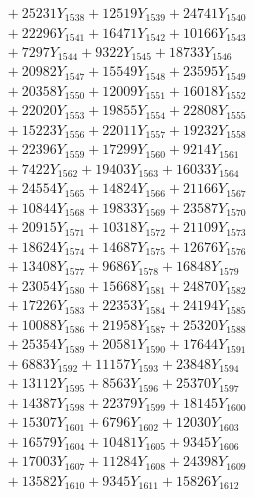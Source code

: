 \documentclass[a4paper,10pt]{article}
\begin{document}
{\begin{align}
&\;  + 25231 Y_{1538} + 12519 Y_{1539} + 24741 Y_{1540} \\[0.3ex]
&\;  + 22296 Y_{1541} + 16471 Y_{1542} + 10166 Y_{1543} \\[0.3ex]
&\;  + 7297 Y_{1544} + 9322 Y_{1545} + 18733 Y_{1546} \\[0.3ex]
&\;  + 20982 Y_{1547} + 15549 Y_{1548} + 23595 Y_{1549} \\[0.3ex]
&\;  + 20358 Y_{1550} + 12009 Y_{1551} + 16018 Y_{1552} \\[0.3ex]
&\;  + 22020 Y_{1553} + 19855 Y_{1554} + 22808 Y_{1555} \\[0.3ex]
&\;  + 15223 Y_{1556} + 22011 Y_{1557} + 19232 Y_{1558} \\[0.5ex]\allowbreak
&\;  + 22396 Y_{1559} + 17299 Y_{1560} + 9214 Y_{1561} \\[0.3ex]
&\;  + 7422 Y_{1562} + 19403 Y_{1563} + 16033 Y_{1564} \\[0.3ex]
&\;  + 24554 Y_{1565} + 14824 Y_{1566} + 21166 Y_{1567} \\[0.3ex]
&\;  + 10844 Y_{1568} + 19833 Y_{1569} + 23587 Y_{1570} \\[0.3ex]
&\;  + 20915 Y_{1571} + 10318 Y_{1572} + 21109 Y_{1573} \\[0.3ex]
&\;  + 18624 Y_{1574} + 14687 Y_{1575} + 12676 Y_{1576} \\[0.3ex]
&\;  + 13408 Y_{1577} + 9686 Y_{1578} + 16848 Y_{1579} \\[0.3ex]
&\;  + 23054 Y_{1580} + 15668 Y_{1581} + 24870 Y_{1582} \\[0.3ex]
&\;  + 17226 Y_{1583} + 22353 Y_{1584} + 24194 Y_{1585} \\[0.3ex]
&\;  + 10088 Y_{1586} + 21958 Y_{1587} + 25320 Y_{1588} \\[0.5ex]\allowbreak
&\;  + 25354 Y_{1589} + 20581 Y_{1590} + 17644 Y_{1591} \\[0.3ex]
&\;  + 6883 Y_{1592} + 11157 Y_{1593} + 23848 Y_{1594} \\[0.3ex]
&\;  + 13112 Y_{1595} + 8563 Y_{1596} + 25370 Y_{1597} \\[0.3ex]
&\;  + 14387 Y_{1598} + 22379 Y_{1599} + 18145 Y_{1600} \\[0.3ex]
&\;  + 15307 Y_{1601} + 6796 Y_{1602} + 12030 Y_{1603} \\[0.3ex]
&\;  + 16579 Y_{1604} + 10481 Y_{1605} + 9345 Y_{1606} \\[0.3ex]
&\;  + 17003 Y_{1607} + 11284 Y_{1608} + 24398 Y_{1609} \\[0.3ex]
&\;  + 13582 Y_{1610} + 9345 Y_{1611} + 15826 Y_{1612} \\[0.3ex]

\end{align}}
\end{document}

